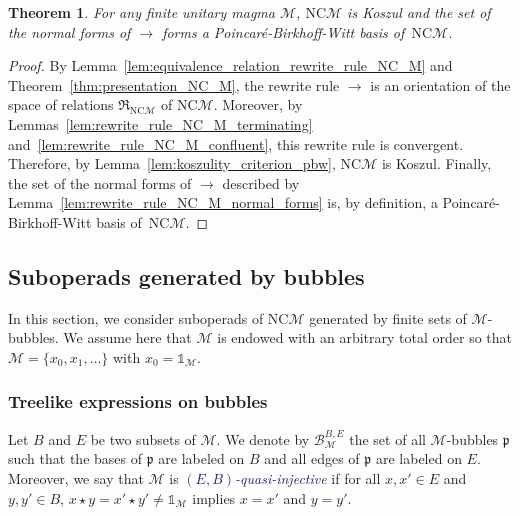 \documentclass[10pt,reqno]{amsart}
\numberwithin{equation}{subsection}
\newtheorem{Theorem}{Theorem}[subsection]
\newcommand{\Mca}{\mathcal{M}}
\newcommand{\Pfr}{\mathfrak{p}}
\newcommand{\NC}{\mathrm{NC}}
\newcommand{\Unit}{\mathds{1}}
\newcommand{\Op}{\star}
\newcommand{\Rew}{\to}
\newcommand{\Rel}{\mathfrak{R}}
\newcommand{\Bubbles}{\mathcal{B}}
\newcommand{\Def}[1]{\textcolor{MidnightBlue}{\em #1}}
\begin{document}
\medskip

\begin{Theorem} \label{thm:Koszul_NC_M}
    For any finite unitary magma $\Mca$, $\NC\Mca$ is Koszul and the set
    of the normal forms of $\Rew$ forms a Poincaré-Birkhoff-Witt basis
    of~$\NC\Mca$.
\end{Theorem}
\begin{proof}
    By Lemma~\ref{lem:equivalence_relation_rewrite_rule_NC_M} and
    Theorem~\ref{thm:presentation_NC_M}, the rewrite rule $\Rew$ is an
    orientation of the space of relations $\Rel_{\NC\Mca}$ of
    $\NC\Mca$. Moreover, by
    Lemmas~\ref{lem:rewrite_rule_NC_M_terminating}
    and~\ref{lem:rewrite_rule_NC_M_confluent}, this rewrite rule is
    convergent. Therefore, by Lemma~\ref{lem:koszulity_criterion_pbw},
    $\NC\Mca$ is Koszul. Finally, the set of the normal forms of $\Rew$
    described by Lemma~\ref{lem:rewrite_rule_NC_M_normal_forms} is, by
    definition, a Poincaré-Birkhoff-Witt basis of~$\NC\Mca$.
\end{proof}
\medskip

\subsection{Suboperads generated by bubbles}
In this section, we consider suboperads of $\NC\Mca$ generated by finite
sets of $\Mca$-bubbles. We assume here that $\Mca$ is endowed with an
arbitrary total order so that $\Mca = \{x_0, x_1, \dots\}$ with
$x_0 = \Unit_\Mca$.
\medskip

\subsubsection{Treelike expressions on bubbles}
Let $B$ and $E$ be two subsets of $\Mca$. We denote by
$\Bubbles_\Mca^{B, E}$ the set of all $\Mca$-bubbles $\Pfr$ such that
the bases of $\Pfr$ are labeled on $B$ and all edges of $\Pfr$ are
labeled on $E$. Moreover, we say that $\Mca$ is
\Def{$(E, B)$-quasi-injective} if for all $x, x' \in E$ and
$y, y' \in B$, $x \Op y = x' \Op y' \ne \Unit_\Mca$ implies $x = x'$ and
$y = y'$.
\medskip
\end{document}
